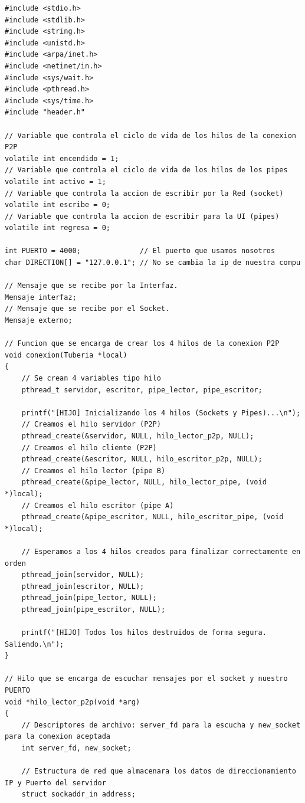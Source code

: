 \begin{lstlisting}[style=estiloC, caption={Archivo del Back-End (conexion P2P)}]
#include <stdio.h>
#include <stdlib.h>
#include <string.h>
#include <unistd.h>
#include <arpa/inet.h>
#include <netinet/in.h>
#include <sys/wait.h>
#include <pthread.h>
#include <sys/time.h>
#include "header.h"

// Variable que controla el ciclo de vida de los hilos de la conexion P2P
volatile int encendido = 1;
// Variable que controla el ciclo de vida de los hilos de los pipes
volatile int activo = 1;
// Variable que controla la accion de escribir por la Red (socket)
volatile int escribe = 0;
// Variable que controla la accion de escribir para la UI (pipes)
volatile int regresa = 0;

int PUERTO = 4000;              // El puerto que usamos nosotros
char DIRECTION[] = "127.0.0.1"; // No se cambia la ip de nuestra compu

// Mensaje que se recibe por la Interfaz.
Mensaje interfaz;
// Mensaje que se recibe por el Socket.
Mensaje externo;

// Funcion que se encarga de crear los 4 hilos de la conexion P2P
void conexion(Tuberia *local)
{
    // Se crean 4 variables tipo hilo
    pthread_t servidor, escritor, pipe_lector, pipe_escritor;

    printf("[HIJO] Inicializando los 4 hilos (Sockets y Pipes)...\n");
    // Creamos el hilo servidor (P2P)
    pthread_create(&servidor, NULL, hilo_lector_p2p, NULL);
    // Creamos el hilo cliente (P2P)
    pthread_create(&escritor, NULL, hilo_escritor_p2p, NULL);
    // Creamos el hilo lector (pipe B)
    pthread_create(&pipe_lector, NULL, hilo_lector_pipe, (void *)local);
    // Creamos el hilo escritor (pipe A)
    pthread_create(&pipe_escritor, NULL, hilo_escritor_pipe, (void *)local);

    // Esperamos a los 4 hilos creados para finalizar correctamente en orden
    pthread_join(servidor, NULL);
    pthread_join(escritor, NULL);
    pthread_join(pipe_lector, NULL);
    pthread_join(pipe_escritor, NULL);

    printf("[HIJO] Todos los hilos destruidos de forma segura. Saliendo.\n");
}

// Hilo que se encarga de escuchar mensajes por el socket y nuestro PUERTO
void *hilo_lector_p2p(void *arg)
{
    // Descriptores de archivo: server_fd para la escucha y new_socket para la conexion aceptada
    int server_fd, new_socket;

    // Estructura de red que almacenara los datos de direccionamiento IP y Puerto del servidor
    struct sockaddr_in address;


\end{lstlisting}
